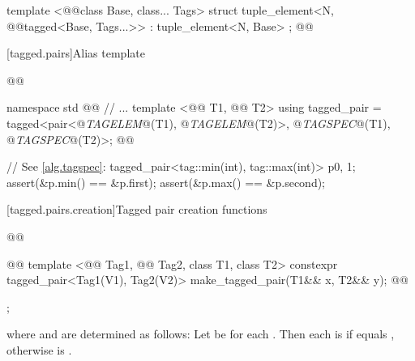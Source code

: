 {\begin{itemdecl}
  template <@@class Base, class... Tags>
  struct tuple_element<N, @@tagged<Base, Tags...>>
    : tuple_element<N, Base> { };
@\newtxt{\}}@
\end{itemdecl}

[tagged.pairs]{Alias template }

\begin{codeblock}
@@

namespace std { @@
  // ...
  template <@@ T1, @@ T2>
  using tagged_pair = tagged<pair<@\textit{TAGELEM}@(T1), @\textit{TAGELEM}@(T2)>,
                             @\textit{TAGSPEC}@(T1), @\textit{TAGSPEC}@(T2)>;
}@\newtxt{\}\}}@
\end{codeblock}

\pnum {}

\pnum \enterexample
\begin{codeblock}
// See \ref{alg.tagspec}:
tagged_pair<tag::min(int), tag::max(int)> p{0, 1};
assert(&p.min() == &p.first);
assert(&p.max() == &p.second);
\end{codeblock}
\exitexample

[tagged.pairs.creation]{Tagged pair creation functions}

%
\begin{itemdecl}
@@

@@
  template <@@ Tag1, @@ Tag2, class T1, class T2>
    constexpr tagged_pair<Tag1(V1), Tag2(V2)> make_tagged_pair(T1&& x, T2&& y);
@\newtxt{\}\}\}}@
\end{itemdecl}

\begin{itemdescr}
\pnum
\returns {};

where  and  are determined as follows: Let  be
 for each . Then each  is 
if  equals , otherwise  is
.


\end{itemdescr}}
